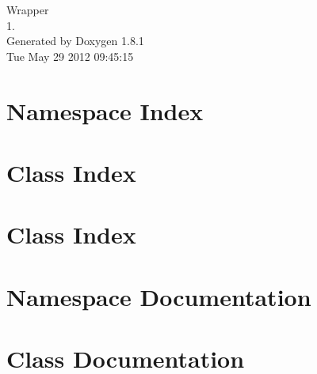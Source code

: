 \documentclass{book}
\begin{document}
\hypersetup{pageanchor=false,citecolor=blue}
\begin{titlepage}
\vspace*{7cm}
\begin{center}
{\Large Wrapper \\[1ex]\large 1. }\\
\vspace*{1cm}
{\large Generated by Doxygen 1.8.1}\\
\vspace*{0.5cm}
{\small Tue May 29 2012 09:45:15}\\
\end{center}
\end{titlepage}
\clearemptydoublepage
{}
\tableofcontents
\clearemptydoublepage
{}
\hypersetup{pageanchor=true,citecolor=blue}
\chapter{Namespace Index}

\chapter{Class Index}

\chapter{Class Index}

\chapter{Namespace Documentation}

\chapter{Class Documentation}












































\printindex
\end{document}
